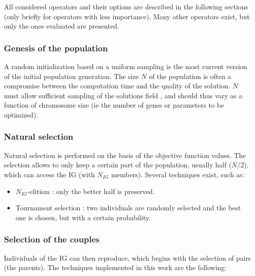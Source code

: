 \documentclass{ametsoc}
\begin{document}
All considered operators and their options are described in the following sections (only briefly for operators with less importance). Many other operators exist, but only the ones evaluated are presented.

\subsubsection{Genesis of the population}

A random initialization based on a uniform sampling is the most current version of the initial population generation. The size $N$ of the population is often a compromise between the computation time and the quality of the solution. $N$ must allow sufficient sampling of the solutions field \citep{Beasley1996a}, and should thus vary as a function of chromosome size (ie the number of genes or parameters to be optimized). 


\subsubsection{Natural selection}
\label{sec:gas:nat_selection}

Natural selection is performed on the basis of the objective function values. The selection allows to only keep a certain part of the population, usually half ($N/2$), which can access the IG (with $N_{IG}$ members). Several techniques exist, such as:

\begin{itemize}
	\item $N_{IG}$-elitism \citep{Michalewicz1996}: only the better half is preserved. 
	
	\item Tournament selection \citep{Michalewicz1996, Zitzler2004a}: two individuals are randomly selected and the best one is chosen, but with a certain probability.
\end{itemize}


\subsubsection{Selection of the couples}
\label{sec:gas:selection_couples}

Individuals of the IG can then reproduce, which begins with the selection of pairs (the parents). The techniques implemented in this work are the following:
\end{document}
